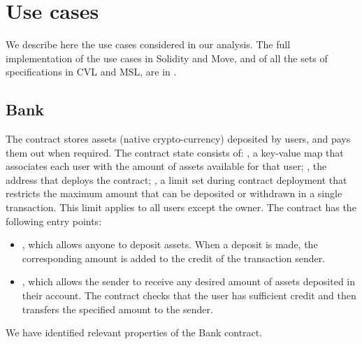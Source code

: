 \section{Use cases}
\label{sec:benchmark}

We describe here the use cases considered in our analysis.
The full implementation of the use cases in Solidity and Move, and of all the sets of specifications in CVL and MSL, are in \githuburl.



\subsection{Bank}

The  contract stores assets (native crypto-currency) deposited by users, and pays them out when required. The contract state consists of:
, a key-value map that associates each user with the amount of assets available for that user;
, the address that deploys the contract;
, a limit set during contract deployment that restricts the maximum amount that can be deposited or withdrawn in a single transaction. This limit applies to all users except the owner.
The contract has the following entry points:
\begin{itemize}
\item {}, which allows anyone to deposit assets. When a deposit is made, the corresponding amount is added to the credit of the transaction sender.
\item {}, which allows the sender to receive any desired amount of assets deposited in their account. The contract checks that the user has sufficient credit and then transfers the specified amount to the sender.
\end{itemize}
%
We have identified \nBankProperties relevant properties of the Bank contract. 
    
